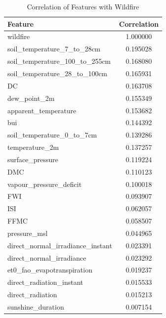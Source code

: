 \begin{table}[H]
	\caption{Correlation of Features with Wildfire}
	\centering
	\label{wildfire_correlation}
	\begin{tabular}{lc}
		\hline
		Feature                                   & Correlation \\ \hline
		wildfire                                  & 1.000000    \\ 
		soil\_temperature\_7\_to\_28cm          & 0.195028    \\ 
		soil\_temperature\_100\_to\_255cm       & 0.168080    \\ 
		soil\_temperature\_28\_to\_100cm        & 0.165931    \\ 
		DC                                         & 0.163708    \\ 
		dew\_point\_2m                        & 0.155349    \\ 
		apparent\_temperature                & 0.153682    \\ 
		bui                                        & 0.144392    \\ 
		soil\_temperature\_0\_to\_7cm           & 0.139286    \\ 
		temperature\_2m                      & 0.137257    \\ 
		surface\_pressure                    & 0.119224    \\ 
		DMC                                        & 0.110123    \\ 
		vapour\_pressure\_deficit             & 0.100018    \\ 
		FWI                                       & 0.093907    \\ 
		ISI                                        & 0.062057    \\ 
		FFMC                                       & 0.058507    \\ 
		pressure\_msl                        & 0.044965    \\ 
		direct\_normal\_irradiance\_instant    & 0.023391    \\ 
		direct\_normal\_irradiance            & 0.023292    \\ 
		et0\_fao\_evapotranspiration          & 0.019237    \\ 
		direct\_radiation\_instant            & 0.015533    \\ 
		direct\_radiation                    & 0.015213    \\ 
		sunshine\_duration                   & 0.007154    \\ 

\end{tabular}
\end{table}

